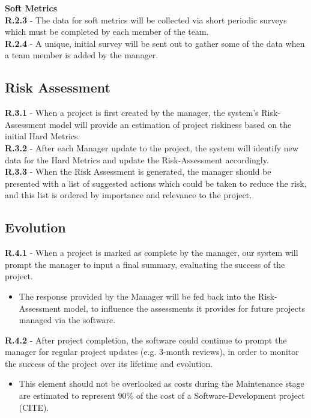 \documentclass[a4paper]{article}
\theoremstyle{plain}
\theoremstyle{definition}
\theoremstyle{remark}
\begin{document}
\noindent\textbf{Soft Metrics}\\

\indent \textbf{R.2.3} - The data for soft metrics will be collected via short periodic surveys which must be completed by each member of the team.\\
\indent \textbf{R.2.4} - A unique, initial survey will be sent out to gather some of the data when a team member is added by the manager.
\vspace{8cm}
\subsection*{Risk Assessment}
\textbf{R.3.1} - When a project is first created by the manager, the system’s Risk-Assessment model will provide an estimation of project riskiness based on the initial Hard Metrics. \\
\textbf{R.3.2} - After each Manager update to the project, the system will identify new data for the Hard Metrics and update the Risk-Assessment accordingly. \\
\textbf{R.3.3} - When the Risk Assessment is generated, the manager should be presented with a list of suggested actions which could be taken to reduce the risk, and this list is ordered by importance and relevance to the project.
\subsection*{Evolution}
\textbf{R.4.1} - When a project is marked as complete by the manager, our system will prompt the manager to input a final summary, evaluating the success of the project.
\begin{itemize}
	\item The response provided by the Manager will be fed back into the Risk-Assessment model, to influence the assessments it provides for future projects managed via the software.
\end{itemize}
\textbf{R.4.2} - After project completion, the software could continue to prompt the manager for regular project updates (e.g. $3$-month reviews), in order to monitor the success of the project over its lifetime and evolution. 
\begin{itemize}
	\item This element should not be overlooked as costs during the Maintenance stage are estimated to represent $90\%$ of the cost of a Software-Development project (CITE).
\end{itemize}
\end{document}
